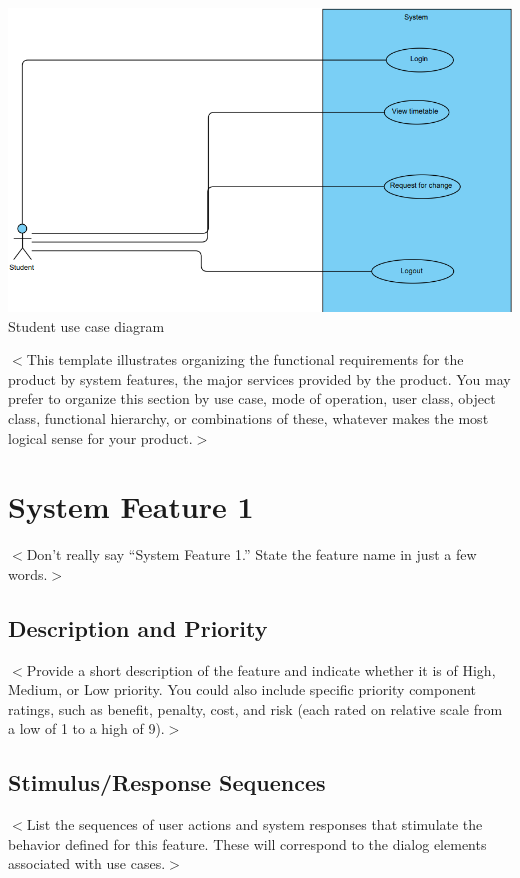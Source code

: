 \documentclass{scrreprt}
\begin{document}
 \begin{center}
\includegraphics[scale=0.6]{student.png}
Student use case diagram
\end{center}




$<$This template illustrates organizing the functional requirements for the 
product by system features, the major services provided by the product. You may 
prefer to organize this section by use case, mode of operation, user class, 
object class, functional hierarchy, or combinations of these, whatever makes the 
most logical sense for your product.$>$

\section{System Feature 1}
$<$Don’t really say “System Feature 1.” State the feature name in just a few 
words.$>$

\subsection{Description and Priority}
$<$Provide a short description of the feature and indicate whether it is of 
High, Medium, or Low priority. You could also include specific priority 
component ratings, such as benefit, penalty, cost, and risk (each rated on
relative scale from a low of 1 to a high of 9).$>$

\subsection{Stimulus/Response Sequences}
$<$List the sequences of user actions and system responses that stimulate the 
behavior defined for this feature. These will correspond to the dialog elements 
associated with use cases.$>$
\end{document}
